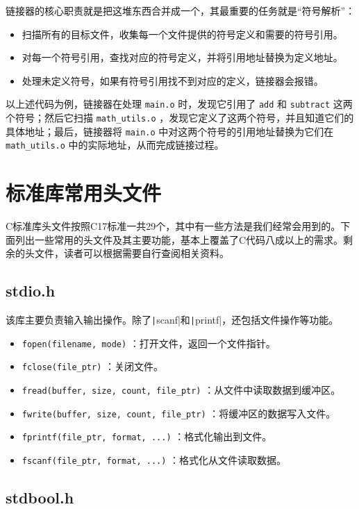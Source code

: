 链接器的核心职责就是把这堆东西合并成一个，其最重要的任务就是“符号解析”：
\begin{itemize}
    \item 扫描所有的目标文件，收集每一个文件提供的符号定义和需要的符号引用。
    \item 对每一个符号引用，查找对应的符号定义，并将引用地址替换为定义地址。
    \item 处理未定义符号，如果有符号引用找不到对应的定义，链接器会报错。
\end{itemize}
以上述代码为例，链接器在处理 \texttt{main.o} 时，发现它引用了 \texttt{add} 和 \texttt{subtract} 这两个符号；然后它扫描 \texttt{math\_utils.o} ，发现它定义了这两个符号，并且知道它们的具体地址；最后，链接器将 \texttt{main.o} 中对这两个符号的引用地址替换为它们在 \texttt{math\_utils.o} 中的实际地址，从而完成链接过程。

\section{标准库常用头文件}

C标准库头文件按照C17标准一共29个，其中有一些方法是我们经常会用到的。下面列出一些常用的头文件及其主要功能，基本上覆盖了C代码八成以上的需求。剩余的头文件，读者可以根据需要自行查阅相关资料。

\subsection{stdio.h}

该库主要负责输入输出操作。除了\texttt|scanf|和\texttt|printf|，还包括文件操作等功能。
\begin{itemize}
  \item \texttt{fopen(filename, mode)} ：打开文件，返回一个文件指针。
  \item \texttt{fclose(file\_ptr)} ：关闭文件。
  \item \texttt{fread(buffer, size, count, file\_ptr)} ：从文件中读取数据到缓冲区。
  \item \texttt{fwrite(buffer, size, count, file\_ptr)} ：将缓冲区的数据写入文件。
  \item \texttt{fprintf(file\_ptr, format, ...)} ：格式化输出到文件。
  \item \texttt{fscanf(file\_ptr, format, ...)} ：格式化从文件读取数据。
\end{itemize}

\subsection{stdbool.h}

